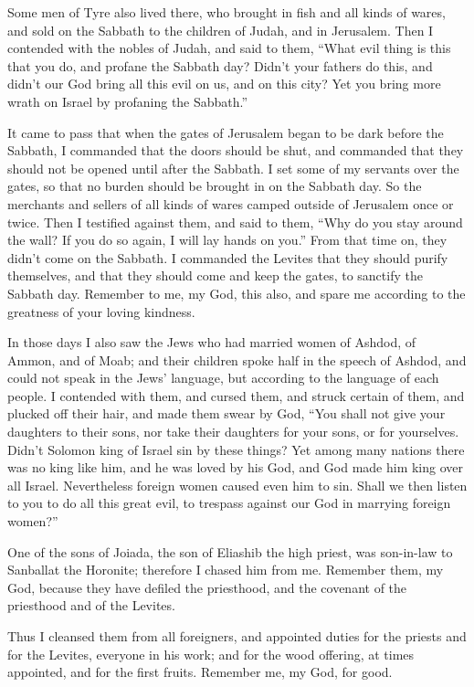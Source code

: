 {Some men of Tyre also lived there, who brought in fish and all kinds of wares, and sold on the Sabbath to the children of Judah, and in Jerusalem.
Then I contended with the nobles of Judah, and said to them, “What evil thing is this that you do, and profane the Sabbath day?
Didn’t your fathers do this, and didn’t our God bring all this evil on us, and on this city? Yet you bring more wrath on Israel by profaning the Sabbath.”
\par }{\PP {}It came to pass that when the gates of Jerusalem began to be dark before the Sabbath, I commanded that the doors should be shut, and commanded that they should not be opened until after the Sabbath. I set some of my servants over the gates, so that no burden should be brought in on the Sabbath day.
So the merchants and sellers of all kinds of wares camped outside of Jerusalem once or twice.
Then I testified against them, and said to them, “Why do you stay around the wall? If you do so again, I will lay hands on you.” From that time on, they didn’t come on the Sabbath.
I commanded the Levites that they should purify themselves, and that they should come and keep the gates, to sanctify the Sabbath day. Remember to me, my God, this also, and spare me according to the greatness of your loving kindness.
\par }{\PP {}In those days I also saw the Jews who had married women of Ashdod, of Ammon, and of Moab;
and their children spoke half in the speech of Ashdod, and could not speak in the Jews’ language, but according to the language of each people.
I contended with them, and cursed them, and struck certain of them, and plucked off their hair, and made them swear by God, “You shall not give your daughters to their sons, nor take their daughters for your sons, or for yourselves.
Didn’t Solomon king of Israel sin by these things? Yet among many nations there was no king like him, and he was loved by his God, and God made him king over all Israel. Nevertheless foreign women caused even him to sin.
Shall we then listen to you to do all this great evil, to trespass against our God in marrying foreign women?”
\par }{\PP {}One of the sons of Joiada, the son of Eliashib the high priest, was son-in-law to Sanballat the Horonite; therefore I chased him from me.
Remember them, my God, because they have defiled the priesthood, and the covenant of the priesthood and of the Levites.
\par }{\PP {}Thus I cleansed them from all foreigners, and appointed duties for the priests and for the Levites, everyone in his work;
and for the wood offering, at times appointed, and for the first fruits. Remember me, my God, for good.
\par }